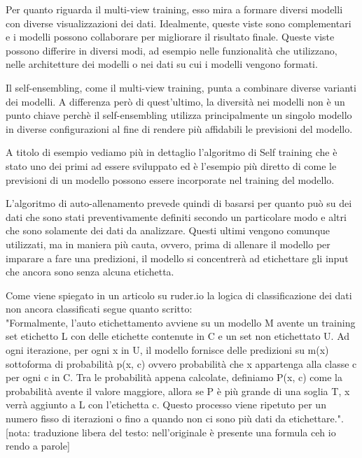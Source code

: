 \documentclass[12pt,italian]{report}
\begin{document}
Per quanto riguarda il multi-view training, esso mira a formare diversi modelli con diverse visualizzazioni dei dati. Idealmente, queste viste sono complementari e i modelli possono collaborare per migliorare il risultato finale. Queste viste possono differire in diversi modi, ad esempio nelle funzionalità che utilizzano, nelle architetture dei modelli o nei dati su cui i modelli vengono formati.

Il self-ensembling, come il multi-view training, punta a combinare diverse varianti dei modelli. A differenza però di quest'ultimo, la diversità nei modelli non è un punto chiave perchè il self-ensembling utilizza principalmente un singolo modello in diverse configurazioni al fine di rendere più affidabili le previsioni del modello. 

A titolo di esempio vediamo più in dettaglio l'algoritmo di Self training che è stato uno dei primi ad essere sviluppato ed è l'esempio più diretto di come le previsioni di un modello possono essere incorporate nel training del modello.

L'algoritmo di auto-allenamento prevede quindi di basarsi per quanto può su dei dati che sono stati preventivamente definiti secondo un particolare modo e altri che sono solamente dei dati da analizzare. Questi ultimi vengono comunque utilizzati, ma in maniera più cauta, ovvero, prima di allenare il modello per imparare a fare una predizioni, il modello si concentrerà ad etichettare gli input che ancora sono senza alcuna etichetta.

Come viene spiegato in un articolo su ruder.io %
la logica di classificazione dei dati non ancora classificati segue quanto scritto:		\\
"Formalmente, l'auto etichettamento avviene su un modello M avente un training set etichetto L con delle etichette contenute in C e un set non etichettato U. Ad ogni iterazione, per ogni x in U, il modello fornisce delle predizioni su m(x) sottoforma di probabilità p(x, c) ovvero probabilità che x appartenga alla classe c per ogni c in C. Tra le probabilità appena calcolate, definiamo P(x, c) come la probabilità avente il valore maggiore, allora se P è più grande di una soglia T, x verrà aggiunto a L con l'etichetta c. Questo processo viene ripetuto per un numero fisso di iterazioni o fino a quando non ci sono più dati da etichettare.".[nota: traduzione libera del testo: nell'originale è presente una formula ceh io rendo a parole]
\end{document}
